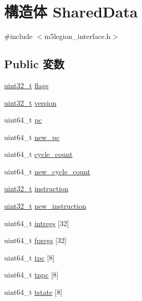 \hypertarget{structSharedData}{
\section{構造体 SharedData}
\label{structSharedData}
}


{\ttfamily \#include $<$m5legion\_\-interface.h$>$}\subsection*{Public 変数}
\begin{DoxyCompactItemize}
\item 
\hyperlink{Type_8hh_a435d1572bf3f880d55459d9805097f62}{uint32\_\-t} \hyperlink{structSharedData_a773b39d480759f67926cb18ae2219281}{flags}
\item 
\hyperlink{Type_8hh_a435d1572bf3f880d55459d9805097f62}{uint32\_\-t} \hyperlink{structSharedData_acd99bb05ca015e7d74448acb1deba7ca}{version}
\item 
uint64\_\-t \hyperlink{structSharedData_a37cc15f96d8bac81ed087fc247a0c5a0}{pc}
\item 
uint64\_\-t \hyperlink{structSharedData_a1877cfba8eb1f4df381602e16709e254}{new\_\-pc}
\item 
uint64\_\-t \hyperlink{structSharedData_afa05c942f9cf818d5054dfdbcfc4343e}{cycle\_\-count}
\item 
uint64\_\-t \hyperlink{structSharedData_a84bfd8e4b6678ae5e497cef8ba9e6cc2}{new\_\-cycle\_\-count}
\item 
\hyperlink{Type_8hh_a435d1572bf3f880d55459d9805097f62}{uint32\_\-t} \hyperlink{structSharedData_a22d29c2a104d02e0935069c310867bdd}{instruction}
\item 
\hyperlink{Type_8hh_a435d1572bf3f880d55459d9805097f62}{uint32\_\-t} \hyperlink{structSharedData_a111492c5c14309cc0e225a8141d2bd10}{new\_\-instruction}
\item 
uint64\_\-t \hyperlink{structSharedData_a1906194724b4dff083f82847d4361ac9}{intregs} \mbox{[}32\mbox{]}
\item 
uint64\_\-t \hyperlink{structSharedData_a69c20a49e8de6aae2b007113159b9c43}{fpregs} \mbox{[}32\mbox{]}
\item 
uint64\_\-t \hyperlink{structSharedData_a13203690bfb57af632ec75e59873dc70}{tpc} \mbox{[}8\mbox{]}
\item 
uint64\_\-t \hyperlink{structSharedData_adcd7c004dfc3925d9ac7b8cd3043f563}{tnpc} \mbox{[}8\mbox{]}
\item 
uint64\_\-t \hyperlink{structSharedData_a6b9f90839fbdd22ce4fc36cda8cedf4d}{tstate} \mbox{[}8\mbox{]}

\end{DoxyCompactItemize}
